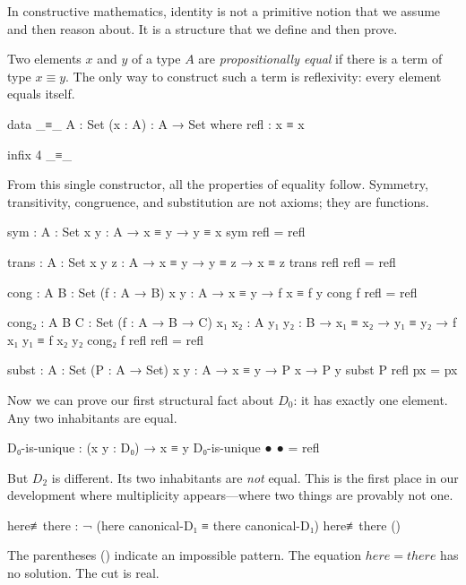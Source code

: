 \documentclass[11pt,a4paper]{book}
\def\texttt#1{#1}%
\def\text#1{#1}%
\begin{document}
In constructive mathematics, identity is not a primitive notion that we 
assume and then reason about. It is a structure that we define and then 
prove.

Two elements $x$ and $y$ of a type $A$ are \emph{propositionally equal} if 
there is a term of type $x \equiv y$. The only way to construct such a 
term is reflexivity: every element equals itself.

\begin{code}
data _≡_ {A : Set} (x : A) : A → Set where
  refl : x ≡ x

infix 4 _≡_
\end{code}

From this single constructor, all the properties of equality follow. 
Symmetry, transitivity, congruence, and substitution are not axioms; they 
are functions.

\begin{code}
sym : {A : Set} {x y : A} → x ≡ y → y ≡ x
sym refl = refl

trans : {A : Set} {x y z : A} → x ≡ y → y ≡ z → x ≡ z
trans refl refl = refl

cong : {A B : Set} (f : A → B) {x y : A} → x ≡ y → f x ≡ f y
cong f refl = refl

cong₂ : {A B C : Set} (f : A → B → C) {x₁ x₂ : A} {y₁ y₂ : B} 
      → x₁ ≡ x₂ → y₁ ≡ y₂ → f x₁ y₁ ≡ f x₂ y₂
cong₂ f refl refl = refl

subst : {A : Set} (P : A → Set) {x y : A} → x ≡ y → P x → P y
subst P refl px = px
\end{code}

Now we can prove our first structural fact about $D_0$: it has exactly one 
element. Any two inhabitants are equal.

\begin{code}
D₀-is-unique : (x y : D₀) → x ≡ y
D₀-is-unique ● ● = refl
\end{code}

But $D_2$ is different. Its two inhabitants are \emph{not} equal. This is 
the first place in our development where multiplicity appears---where two 
things are provably not one.

\begin{code}
here≢there : ¬ (here canonical-D₁ ≡ there canonical-D₁)
here≢there ()
\end{code}

The parentheses \texttt{()} indicate an impossible pattern. The equation 
$\text{here} = \text{there}$ has no solution. The cut is real.
\end{document}
